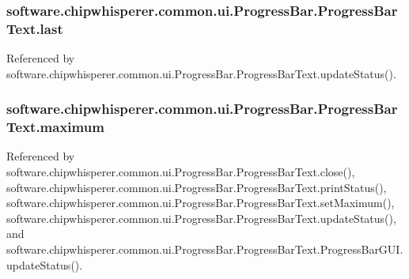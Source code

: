 \subsubsection[{last}]{\setlength{\rightskip}{0pt plus 5cm}software.\+chipwhisperer.\+common.\+ui.\+Progress\+Bar.\+Progress\+Bar\+Text.\+last}\label{classsoftware_1_1chipwhisperer_1_1common_1_1ui_1_1ProgressBar_1_1ProgressBarText_a71f54cd66ddbf27c5bdbbfb4f43c905d}


Referenced by software.\+chipwhisperer.\+common.\+ui.\+Progress\+Bar.\+Progress\+Bar\+Text.\+update\+Status().

\hypertarget{classsoftware_1_1chipwhisperer_1_1common_1_1ui_1_1ProgressBar_1_1ProgressBarText_af23b7a0eff3cadc131c1aa94eda45860}{}
\subsubsection[{maximum}]{\setlength{\rightskip}{0pt plus 5cm}software.\+chipwhisperer.\+common.\+ui.\+Progress\+Bar.\+Progress\+Bar\+Text.\+maximum}\label{classsoftware_1_1chipwhisperer_1_1common_1_1ui_1_1ProgressBar_1_1ProgressBarText_af23b7a0eff3cadc131c1aa94eda45860}


Referenced by software.\+chipwhisperer.\+common.\+ui.\+Progress\+Bar.\+Progress\+Bar\+Text.\+close(), software.\+chipwhisperer.\+common.\+ui.\+Progress\+Bar.\+Progress\+Bar\+Text.\+print\+Status(), software.\+chipwhisperer.\+common.\+ui.\+Progress\+Bar.\+Progress\+Bar\+Text.\+set\+Maximum(), software.\+chipwhisperer.\+common.\+ui.\+Progress\+Bar.\+Progress\+Bar\+Text.\+update\+Status(), and software.\+chipwhisperer.\+common.\+ui.\+Progress\+Bar.\+Progress\+Bar\+Text.\+Progress\+Bar\+G\+U\+I.\+update\+Status().

\hypertarget{classsoftware_1_1chipwhisperer_1_1common_1_1ui_1_1ProgressBar_1_1ProgressBarText_a61554f0e647192d2b7986d3f75ce401c}{}
